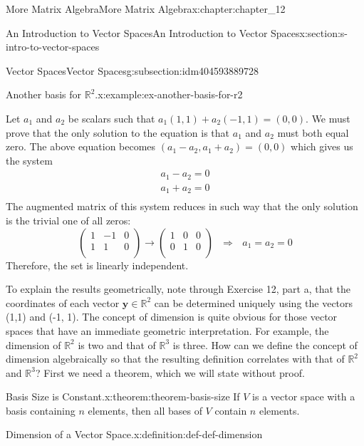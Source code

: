 \documentclass[twoside,10pt,]{book}
\numberwithin{equation}{section}
\renewcommand{\vec}[1]{\mathbf{#1}}
\begin{document}
\begin{chapterptx}{More Matrix Algebra}{}{More Matrix Algebra}{}{}{x:chapter:chapter_12}
\begin{sectionptx}{An Introduction to Vector Spaces}{}{An Introduction to Vector Spaces}{}{}{x:section:s-intro-to-vector-spaces}
\begin{subsectionptx}{Vector Spaces}{}{Vector Spaces}{}{}{g:subsection:idm404593889728}
\begin{example}{Another basis for \(\mathbb{R}^2\).}{x:example:ex-another-basis-for-r2}
\par
Let \(a_1\) and \(a_2\) be scalars such that \(a_1 (1, 1) + a_2 (-1, 1) = (0, 0)\). We must prove that the only solution to the equation is that \(a_1\) and \(a_2\) must both equal zero. The above equation becomes \(\left(a_1- a_2 , a_1 + a_2 \right) = (0, 0)\) which gives us the system%
\begin{equation*}
\begin{array}{c}
a_1 - a_{2 }=0 \\
a_1 + a_2=0\\
\end{array}
\end{equation*}
The augmented matrix of this system reduces in such way that the only solution is the trivial one of all zeros:%
\begin{equation*}
\left(
\begin{array}{cc|c}
1 & -1 & 0 \\
1 & 1 & 0 \\
\end{array}
\right)\longrightarrow \left(
\begin{array}{cc|c}
1 & 0 & 0 \\
0 & 1 & 0 \\
\end{array}
\right)\textrm{    }\Rightarrow \textrm{    }a_1 = a_2 =0
\end{equation*}
Therefore, the set is linearly independent.%
\end{example}
To explain the results geometrically, note through Exercise 12, part a, that the coordinates of each vector \(\vec{y} \in \mathbb{R}^2\) can be determined uniquely using the vectors (1,1) and (-1, 1). The concept of dimension is quite obvious for those vector spaces that have an immediate geometric interpretation.  For example, the dimension of \(\mathbb{R}^2\) is two and that of \(\mathbb{R}^3\) is three. How can we define the concept of dimension algebraically so that the resulting definition correlates with that of \(\mathbb{R}^2\) and \(\mathbb{R}^3\)? First we need a theorem, which we will state without proof.%
\begin{theorem}{Basis Size is Constant.}{}{x:theorem:theorem-basis-size}%
If \(V\) is a vector space with a basis containing \(n\) elements, then all bases of \(V\) contain \(n\) elements.%
\end{theorem}
\begin{definition}{Dimension of a Vector Space.}{x:definition:def-def-dimension}%
%
\label{g:notation:idm404593728688}%

\end{definition}
\end{subsectionptx}
\end{sectionptx}
\end{chapterptx}
\end{document}
